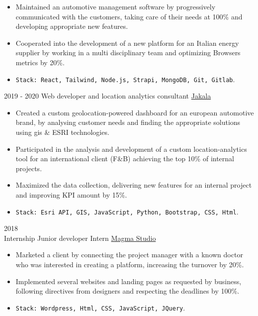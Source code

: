 \documentclass[9pt]{developercv} %
\begin{document}
\begin{entrylist}
{\begin{itemize}[noitemsep,topsep=0pt,parsep=0pt,partopsep=0pt, leftmargin=-1pt]
            \item Maintained an automotive management software by progressively communicated with the customers, taking care of their needs at 100\% and developing appropriate new features.
            \item Cooperated into the development of a new platform for an Italian energy supplier by working in a multi disciplinary team and optimizing Browsers metrics by 20\%.  
       \item   \texttt{Stack: React, Tailwind, Node.js, Strapi, MongoDB, Git, Gitlab}. \end{itemize} }
	\entry
		{2019 - 2020}
		{Web developer and location analytics consultant}
		{\href{https://www.jakala.com/}{Jakala}}
		{\vspace{-10pt}
        \begin{itemize}[noitemsep,topsep=0pt,parsep=0pt,partopsep=0pt, leftmargin=-1pt]
            \item Created a custom geolocation-powered dashboard for an european automotive brand, by analysing customer needs and finding the appropriate solutions using gis \& ESRI technologies.
            \item Participated in the analysis and development of a custom location-analytics tool for an international client (F\&B) achieving the top 10\% of internal projects.
            \item Maximized the data collection, delivering new features for an internal project and improving KPI amount by 15\%.
        \item  \texttt{Stack: Esri API, GIS, JavaScript, Python, Bootstrap, CSS, Html}.\end{itemize}}
        \entry
		{2018 \\\footnotesize{Internship}}
		{Junior developer Intern}
		{\href{https://magmastudio.red/}{Magma Studio}}
		{\vspace{-10pt}
            \begin{itemize}[noitemsep,topsep=0pt,parsep=0pt,partopsep=0pt, leftmargin=-1pt]
            \item Marketed a client by connecting the project manager with a known doctor who was interested in creating a platform, increasing the turnover by 20\%.
            \item Implemented several websites and landing pages as requested by business, following directives from designers and respecting the deadlines by 100\%.
        
            \item  \texttt{Stack: Wordpress, Html, CSS, JavaScript, JQuery}.
        \end{itemize} }
\end{entrylist}
\end{document}
